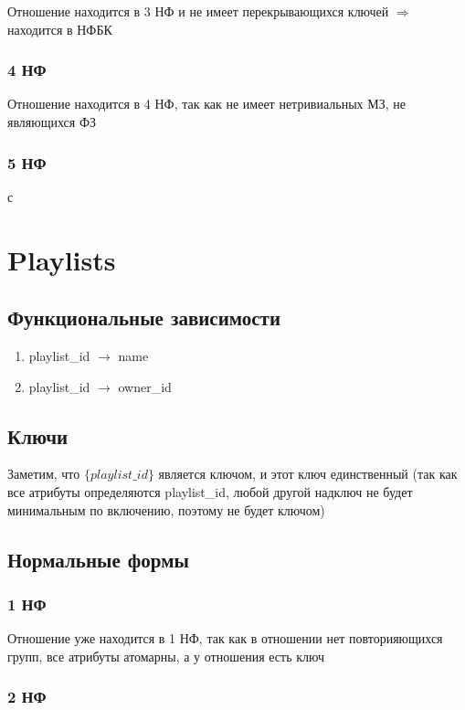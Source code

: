 \documentclass{article}
\begin{document}
Отношение находится в 3 НФ и не имеет перекрывающихся ключей $\Rightarrow$ находится в НФБК

\subsubsection{4 НФ}

Отношение находится в 4 НФ, так как не имеет нетривиальных МЗ, не являющихся ФЗ

\subsubsection{5 НФ}

с

\section{Playlists}

\subsection{Функциональные зависимости}
\begin{enumerate}
	\item playlist\_id $\rightarrow$ name
	\item playlist\_id $\rightarrow$ owner\_id

\end{enumerate}

\subsection{Ключи}
Заметим, что $\{playlist\_id\}$ является ключом, и этот ключ единственный (так как все атрибуты определяются playlist\_id, любой другой надключ не будет минимальным по включению, поэтому не будет ключом)

\subsection{Нормальные формы}

\subsubsection{1 НФ}

Отношение уже находится в 1 НФ, так как в отношении нет повторияющихся групп, все атрибуты атомарны, а у отношения есть ключ

\subsubsection{2 НФ}
\end{document}
